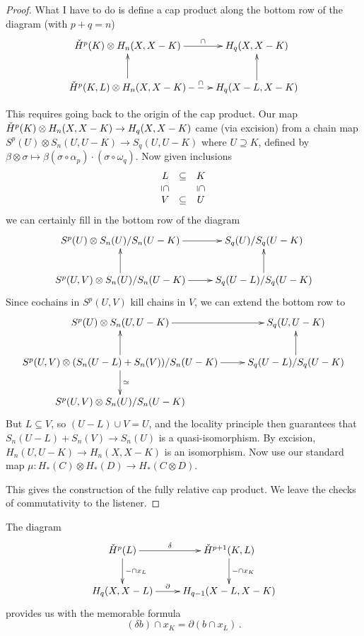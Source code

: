 \begin{proof}
What I have to do is define a cap product along the bottom row of the
diagram (with $p+q=n$)
\begin{equation*}
\xymatrix{
\cHH^p(K)\otimes H_n(X,X-K)\ar[r]^-{\cap} & H_q(X,X-K)\\
\cHH^p(K,L)\otimes H_n(X,X-K)\ar[u]\ar@{-->}[r]^-{\cap} & H_q(X-L,X-K) \ar[u]
}
\end{equation*}

This requires going back to the origin of the cap product. 
Our map $\check{H}^p(K)\otimes H_n(X,X-K)\to H_q(X,X-K)$ came (via excision)
 from a chain map $S^p(U)\otimes S_n(U,U-K)\to S_q(U,U-K)$ where $U\supseteq K$, defined by $\beta\otimes\sigma\mapsto\beta(\sigma\circ\alpha_p)\cdot(\sigma\circ\omega_q)$. Now given inclusions
\[
\begin{array}{ccc} L & \subseteq & K \\
\downsubseteq & & \downsubseteq \\
V & \subseteq & U
\end{array}
\]
we can certainly fill in the bottom row of the diagram
\begin{equation*}
\xymatrix{
S^p(U)\otimes S_n(U)/S_n(U-K)\ar[r] & S_q(U)/S_q(U-K)\\
S^p(U,V)\otimes S_n(U)/S_n(U-K)\ar[r]\ar[u] & S_q(U-L)/S_q(U-K)\ar[u]
}
\end{equation*}
Since cochains in $S^p(U,V)$ kill chains in $V$, we can extend the bottom
row to 
\begin{equation*}
\xymatrix{
	S^p(U)\otimes S_n(U,U-K)\ar[r] & S_q(U,U-K)\\
	S^p(U,V)\otimes (S_n(U-L)+S_n(V))/S_n(U-K)\ar[r]\ar[d]^{\simeq}\ar[u] & S_q(U-L)/S_q(U-K)\ar[u]\\
	S^p(U,V)\otimes S_n(U)/S_n(U-K) & 
}
\end{equation*}
But $L\subseteq V$, so $(U-L)\cup V=U$, and the locality principle then
guarantees that $S_n(U-L)+S_n(V)\to S_n(U)$ is a quasi-isomorphism. 
By excision, $H_n(U,U-K)\to H_n(X,X-K)$ is an isomorphism. Now use
our standard map $\mu:H_*(C)\otimes H_*(D)\to H_*(C\otimes D)$. 

This gives the construction of the fully relative cap product. 
We leave the checks of commutativity to the listener.
\end{proof}

The diagram
\begin{equation*}
\xymatrix{
	\cHH^p(L)\ar[r]^-\delta\ar[d]^{-\cap x_L} & \cHH^{p+1}(K,L)\ar[d]^{-\cap x_K}\\
	H_q(X,X-L)\ar[r]^-{\partial} & H_{q-1}(X-L,X-K)
}
\end{equation*}
provides us with the memorable formula
\begin{equation*}
(\delta b)\cap x_K=\partial(b\cap x_L)\,.
\end{equation*}

